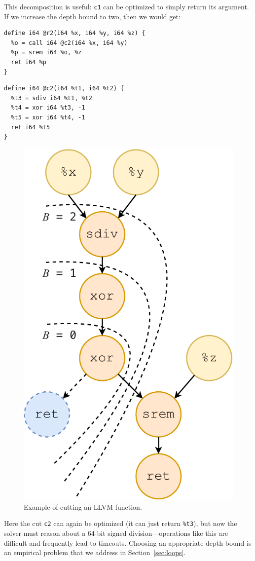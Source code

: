 This decomposition is useful: \texttt{c1} can be optimized to simply
return its argument.
%
If we increase the depth bound to two, then we would get:


{\begin{quoting}
\begin{Verbatim}
define i64 @r2(i64 %x, i64 %y, i64 %z) {
  %o = call i64 @c2(i64 %x, i64 %y)
  %p = srem i64 %o, %z
  ret i64 %p
}
\end{Verbatim}
\end{quoting}}
{\begin{quoting}
\begin{Verbatim}
define i64 @c2(i64 %t1, i64 %t2) {
  %t3 = sdiv i64 %t1, %t2
  %t4 = xor i64 %t3, -1
  %t5 = xor i64 %t4, -1
  ret i64 %t5
}
\end{Verbatim}
\end{quoting}}


\begin{figure}[tbp]
  \centering
  \includegraphics[width=0.5\linewidth]{figures/cut-depth.pdf}
  \caption{Example of cutting an LLVM function.}
  \label{fig:cut-depth}
\end{figure}

Here the cut \texttt{c2} can again be optimized (it can just return
\texttt{\%t3}), but now the solver must reason about a 64-bit signed
division---operations like this are difficult and frequently lead to
timeouts.
%
Choosing an appropriate depth bound is an empirical problem that
we address in Section~\ref{sec:loops}.


